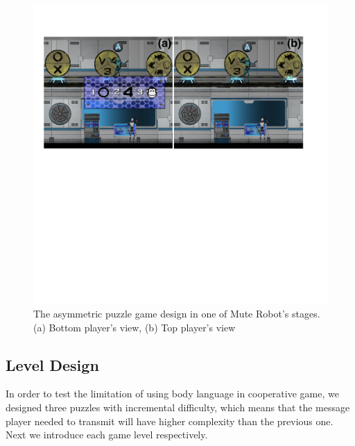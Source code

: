 \begin{figure}[!h]
\centering
\includegraphics[width=1.0\columnwidth]{Figures/GD_F2.pdf}
\caption{The asymmetric puzzle game design in one of Mute Robot's stages. (a) Bottom player's view, (b) Top player's view}
\label{fig:GD_F2}
\end{figure}


\subsection{Level Design}


In order to test the limitation of using body language in cooperative game, we designed three puzzles with incremental difficulty, which means that the message player needed to transmit will have higher complexity than the previous one. Next we introduce each game level respectively.


